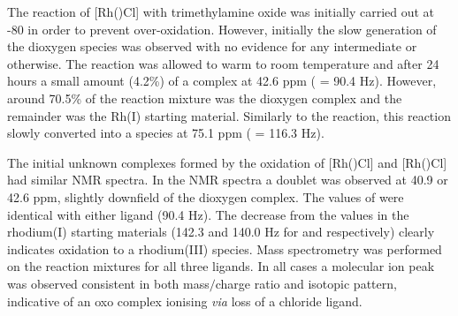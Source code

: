 The reaction of [Rh(\tBuxantphosk)Cl] with trimethylamine oxide was initially carried out at -80 \degC{} in order to prevent over-oxidation.  However, initially the slow generation of the dioxygen species was observed with no evidence for any intermediate or otherwise.  The reaction was allowed to warm to room temperature and after 24 hours a small amount (4.2\%) of a complex at 42.6 ppm (\JRhP{} = 90.4 Hz).  However, around 70.5\%{} of the reaction mixture was the dioxygen complex and the remainder was the Rh(I) starting material.  Similarly to the \tButhixantphos{} reaction, this reaction slowly converted into a species at 75.1 ppm (\JRhP{} = 116.3 Hz).  

The initial unknown complexes formed by the oxidation of [Rh(\tBuxantphosk)Cl] and [Rh(\tButhixantphosk)Cl] had similar NMR spectra. In the \phosphorus{} NMR spectra a doublet was observed at 40.9 or 42.6 ppm, slightly downfield of the dioxygen complex.  The values of \JRhP{} were identical with either ligand (90.4 Hz).  The decrease from the values in the rhodium(I) starting materials (142.3 and 140.0 Hz for \tBuxantphos{} and \tButhixantphos{} respectively) clearly indicates oxidation to a rhodium(III) species.  Mass spectrometry was performed on the reaction mixtures for all three \tBuxantphos{} ligands.  In all cases a molecular ion peak was observed consistent in both mass$/$charge ratio and isotopic pattern, indicative of an oxo complex ionising \emph{via} loss of a chloride ligand.


